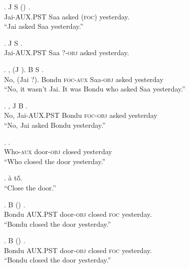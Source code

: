 \documentclass{assets/fieldnotes}
\begin{document}
\exg. J S  () .\\
Jai-\textsc{AUX.PST} Saa asked (\textsc{foc}) yesterday.\\
``Jai asked Saa yesterday.''

\exg. J S   .\\
Jai-\textsc{AUX.PST} Saa \textsc{?-obj} asked yesterday.\\

\exg. , (J ). B  S  .\\
No, (Jai ?). Bondu \textsc{foc-aux} Saa-\textsc{obj} asked yesterday\\
``No, it wasn't Jai. It was Bondu who asked Saa yesterday.''

\exg. , J B   .\\
No, Jai-\textsc{AUX.PST} Bondu \textsc{foc-obj} asked yesterday\\
``No, Jai asked Bondu yesterday.''  

\exg.    .\\
Who-\textsc{aux} door-\textsc{obj} closed yesterday\\
``Who closed the door yesterday.''

\ex. \`a t\'{\~o}.\\
``Close the door.''

\exg. B    () .\\
Bondu \textsc{AUX.PST} door-\textsc{obj} closed \textsc{foc} yesterday.\\
``Bondu closed the door yesterday.''

\exg. B    () .\\
Bondu \textsc{AUX.PST} door-\textsc{obj} closed \textsc{foc} yesterday.\\
``Bondu closed the door yesterday.''\\
\end{document}
